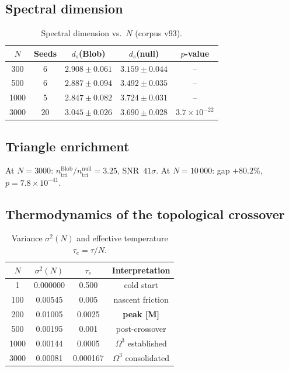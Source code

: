 \documentclass[11pt, a4paper]{article}
\begin{document}
\subsection{Spectral dimension}
\begin{table}[ht]
\centering
\caption{Spectral dimension vs.\ $N$ (corpus v93).}
\begin{tabular}{ccccc}
\toprule
$N$ & Seeds & $d_s$(Blob) & $d_s$(null) & $p$-value \\
\midrule
300  & 6  & $2.908\pm0.061$ & $3.159\pm0.044$ & -- \\
500  & 6  & $2.887\pm0.094$ & $3.492\pm0.035$ & -- \\
1000 & 5  & $2.847\pm0.082$ & $3.724\pm0.031$ & -- \\
3000 & 20 & $3.045\pm0.026$ & $3.690\pm0.028$ & $3.7\times10^{-22}$ \\
\bottomrule
\end{tabular}
\end{table}

\subsection{Triangle enrichment}
At $N=3000$:
$n_{\mathrm{tri}}^{\mathrm{Blob}}/n_{\mathrm{tri}}^{\mathrm{null}}=3.25$,
SNR~$41\sigma$.
At $N=10\,000$: gap $+80.2\%$, $p=7.8\times10^{-41}$.

\subsection{Thermodynamics of the topological crossover}
\begin{table}[ht]
\centering
\caption{Variance $\sigma^2(N)$ and effective temperature $\tau_e=\tau/N$.}
\begin{tabular}{cccc}
\toprule
$N$ & $\sigma^2(N)$ & $\tau_e$ & Interpretation \\
\midrule
1    & 0.000000 & 0.500  & cold start \\
100  & 0.00545  & 0.005  & nascent friction \\
200  & 0.01005  & 0.0025 & \textbf{peak [M]} \\
500  & 0.00195  & 0.001  & post-crossover \\
1000 & 0.00144  & 0.0005 & $\Omega^3$ established \\
3000 & 0.00081  & 0.000167 & $\Omega^3$ consolidated \\
\bottomrule
\end{tabular}
\end{table}
\end{document}
